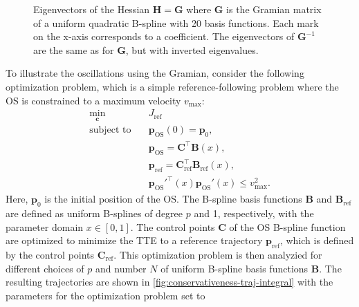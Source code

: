 \begin{figure}
    \centering
    
    \caption{Eigenvectors of the Hessian $\mathbf H = \mathbf G$ where $\mathbf G$ is the Gramian matrix of a uniform quadratic B-spline with 20 basis functions. Each mark on the x-axis corresponds to a coefficient. The eigenvectors of $\mathbf G^{-1}$ are the same as for $\mathbf G$, but with inverted eigenvalues.}
    \label{fig:integral-basis-eigenvectors-20}
\end{figure}



To illustrate the oscillations using the Gramian, consider the following optimization problem, which is a simple reference-following problem where the OS is constrained to a maximum velocity $v_\text{max}$:
\begin{equation}\label{eq:conservativeness-optimization}
    \begin{aligned}
        \min_{\mathbf c} \quad & J_\text{ref} \\
        \text{subject to} \quad &\mathbf p_\text{OS}(0) = \mathbf p_0, \\
                    &\mathbf p_\text{OS} = \mathbf C^\top\mathbf B(x) , \\
                    &\mathbf p_\text{ref} = \mathbf C_\text{ref}^\top\mathbf B_\text{ref}(x) , \\
                    & \mathbf p_\text{OS}'^\top(x) \mathbf p_\text{OS}'(x) \le v_\text{max}^2.
    \end{aligned}
\end{equation}
Here, $\mathbf p_0$ is the initial position of the OS. The B-spline basis functions $\mathbf B$ and $\mathbf B_\text{ref}$ are defined as uniform B-splines of degree $p$ and 1, respectively, with the parameter domain $x\in[0,1]$. The control points $\mathbf C$ of the OS B-spline function are optimized to minimize the TTE to a reference trajectory $\mathbf p_\text{ref}$, which is defined by the control points $\mathbf C_\text{ref}$.
This optimization problem is then analyzied for different choices of $p$ and number $N$ of uniform B-spline basis functions $\mathbf B$. The resulting trajectories are shown in \cref{fig:conservativeness-traj-integral} with the parameters for the optimization problem set to
